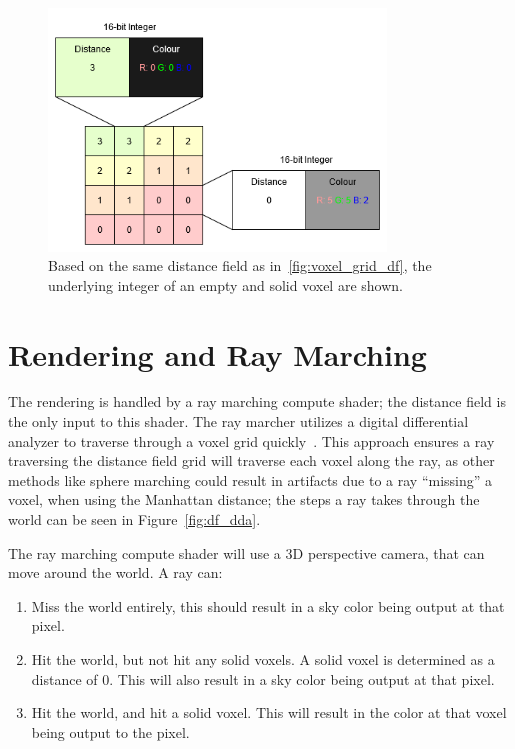 \begin{figure}[htbp]
  \centering
  \includegraphics[width=0.8\textwidth]{figures/df_repr.drawio.png}
  \caption{Based on the same distance field as in~\ref{fig:voxel_grid_df}, the underlying integer of an empty and
    solid voxel are shown.}
  \label{fig:df_repr}
\end{figure}

\FloatBarrier

\section{Rendering and Ray Marching}\label{sec:ray_marching}
The rendering is handled by a ray marching compute shader; the distance field is the only input to this shader. The ray
marcher utilizes a digital differential analyzer to traverse through a voxel grid quickly~\cite{amanatides1987fast}.
This approach ensures a ray traversing the distance field grid will traverse each voxel along the ray, as other methods
like sphere marching could result in artifacts due to a ray ``missing'' a voxel, when using the Manhattan distance; the
steps a ray takes through the world can be seen in Figure~\ref{fig:df_dda}.

The ray marching compute shader will use a 3D perspective camera, that can move around the world. A ray can:

\begin{enumerate}
  \item Miss the world entirely, this should result in a sky color being output at that pixel.
  \item Hit the world, but not hit any solid voxels. A solid voxel is determined as a distance of 0. This will also
        result in a sky color being output at that pixel.
  \item Hit the world, and hit a solid voxel. This will result in the color at that voxel being output to the pixel.
\end{enumerate}

